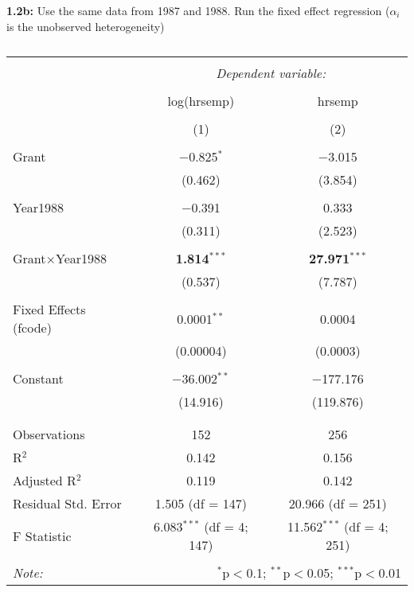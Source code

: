 \documentclass[a4paper]{article}
\begin{document}
\vspace{10cm}

\textbf{1.2b:} Use the same data from 1987 and 1988.  Run the fixed effect regression ($\alpha_i$ is the unobserved heterogeneity)

\begin{table}[!htbp] \centering 
	\caption{} 
	\label{} 
	\begin{tabular}{@{\extracolsep{5pt}}lcc} 
		\\[-1.8ex]\hline 
		\hline \\[-1.8ex] 
		& \multicolumn{2}{c}{\textit{Dependent variable:}} \\ 
		\cline{2-3} 
		\\[-1.8ex] & log(hrsemp) & hrsemp \\ 
		\\[-1.8ex] & (1) & (2)\\ 
		\hline \\[-1.8ex] 
		Grant & $-$0.825$^{*}$ & $-$3.015 \\ 
		& (0.462) & (3.854) \\ 
		& & \\ 
		Year1988 & $-$0.391 & 0.333 \\ 
		& (0.311) & (2.523) \\ 
		& & \\ 
		Grant$\times$Year1988 & \textbf{1.814}$^{***}$ & \textbf{27.971}$^{***}$ \\ 
		& (0.537) & (7.787) \\ 
		& & \\ 
		Fixed Effects (fcode) & 0.0001$^{**}$ & 0.0004 \\ 
		& (0.00004) & (0.0003) \\ 
		& & \\ 
		Constant & $-$36.002$^{**}$ & $-$177.176 \\ 
		& (14.916) & (119.876) \\ 
		& & \\ 
		\hline \\[-1.8ex] 
		Observations & 152 & 256 \\ 
		R$^{2}$ & 0.142 & 0.156 \\ 
		Adjusted R$^{2}$ & 0.119 & 0.142 \\ 
		Residual Std. Error & 1.505 (df = 147) & 20.966 (df = 251) \\ 
		F Statistic & 6.083$^{***}$ (df = 4; 147) & 11.562$^{***}$ (df = 4; 251) \\ 
		\hline 
		\hline \\[-1.8ex] 
		\textit{Note:}  & \multicolumn{2}{r}{$^{*}$p$<$0.1; $^{**}$p$<$0.05; $^{***}$p$<$0.01} \\ 
	\end{tabular} 
\end{table} 
\end{document}
